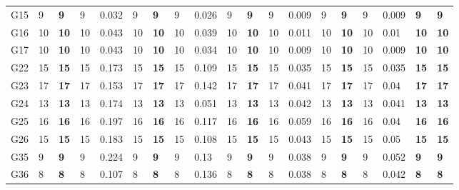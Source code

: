 \documentclass[12pt, a4paper]{article}%
\numberwithin{equation}{section}
\theoremstyle{plain}
\begin{document}
{\begin{landscape}
\begin{longtable}{lllllllllllllllllll}
						G15                       & 9    & \textbf{9}  & 9   & 0.032 & 9    & \textbf{9}  & 9   & 0.026 & 9    & \textbf{9}  & 9   & 0.009 & 9    & \textbf{9}  & 9   & 0.009 & \textbf{9}              & \textbf{9}           \\
						G16                       & 10   & \textbf{10} & 10  & 0.043 & 10   & \textbf{10} & 10  & 0.039 & 10   & \textbf{10} & 10  & 0.011 & 10   & \textbf{10} & 10  & 0.01  & \textbf{10}             & \textbf{10}          \\
						G17                       & 10   & \textbf{10} & 10  & 0.043 & 10   & \textbf{10} & 10  & 0.034 & 10   & \textbf{10} & 10  & 0.009 & 10   & \textbf{10} & 10  & 0.009 & \textbf{10}             & \textbf{10}          \\
						G22                       & 15   & \textbf{15} & 15  & 0.173 & 15   & \textbf{15} & 15  & 0.109 & 15   & \textbf{15} & 15  & 0.035 & 15   & \textbf{15} & 15  & 0.035 & \textbf{15}             & \textbf{15}          \\
						G23                       & 17   & \textbf{17} & 17  & 0.153 & 17   & \textbf{17} & 17  & 0.142 & 17   & \textbf{17} & 17  & 0.041 & 17   & \textbf{17} & 17  & 0.04  & \textbf{17}             & \textbf{17}          \\
						G24                       & 13   & \textbf{13} & 13  & 0.174 & 13   & \textbf{13} & 13  & 0.051 & 13   & \textbf{13} & 13  & 0.042 & 13   & \textbf{13} & 13  & 0.041 & \textbf{13}             & \textbf{13}          \\
						G25                       & 16   & \textbf{16} & 16  & 0.197 & 16   & \textbf{16} & 16  & 0.117 & 16   & \textbf{16} & 16  & 0.059 & 16   & \textbf{16} & 16  & 0.04  & \textbf{16}             & \textbf{16}          \\
						G26                       & 15   & \textbf{15} & 15  & 0.183 & 15   & \textbf{15} & 15  & 0.108 & 15   & \textbf{15} & 15  & 0.043 & 15   & \textbf{15} & 15  & 0.05  & \textbf{15}             & \textbf{15}          \\
						G35                       & 9    & \textbf{9}  & 9   & 0.224 & 9    & \textbf{9}  & 9   & 0.13  & 9    & \textbf{9}  & 9   & 0.038 & 9    & \textbf{9}  & 9   & 0.052 & \textbf{9}              & \textbf{9}           \\
						G36                       & 8    & \textbf{8}  & 8   & 0.107 & 8    & \textbf{8}  & 8   & 0.136 & 8    & \textbf{8}  & 8   & 0.038 & 8    & \textbf{8}  & 8   & 0.042 & \textbf{8}              & \textbf{8}           \\

\end{longtable}
\end{landscape}}
\end{document}

